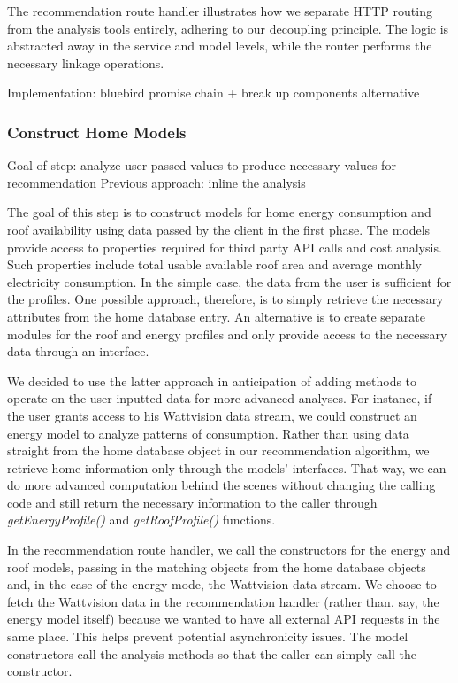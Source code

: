 \documentclass[pageno]{jpaper}
\begin{document}
The recommendation route handler illustrates how we separate HTTP routing from the analysis tools entirely, adhering to our decoupling principle. The logic is abstracted away in the service and model levels, while the router performs the necessary linkage operations.

Implementation: bluebird promise chain + break up components
alternative 

\subsubsection{Construct Home Models}
Goal of step: analyze user-passed values to produce necessary values for recommendation
Previous approach: inline the analysis

The goal of this step is to construct models for home energy consumption and roof availability using data passed by the client in the first phase. The models provide access to properties required for third party API calls and cost analysis. Such properties include total usable available roof area and average monthly electricity consumption. In the simple case, the data from the user is sufficient for the profiles. One possible approach, therefore, is to simply retrieve the necessary attributes from the home database entry. An alternative is to create separate modules for the roof and energy profiles and only provide access to the necessary data through an interface. 

We decided to use the latter approach in anticipation of adding methods to operate on the user-inputted data for more advanced analyses. For instance, if the user grants access to his Wattvision data stream, we could construct an energy model to analyze patterns of consumption. Rather than using data straight from the home database object in our recommendation algorithm, we retrieve home information only through the models' interfaces. That way, we can do more advanced computation behind the scenes without changing the calling code and still return the necessary information to the caller through {\em getEnergyProfile()} and {\em getRoofProfile()} functions.

In the recommendation route handler, we call the constructors for the energy and roof models, passing in the matching objects from the home database objects and, in the case of the energy mode, the Wattvision data stream. We choose to fetch the Wattvision data in the recommendation handler (rather than, say, the energy model itself) because we wanted to have all external API requests in the same place. This helps prevent potential asynchronicity issues. The model constructors call the analysis methods so that the caller can simply call the constructor.
\end{document}

